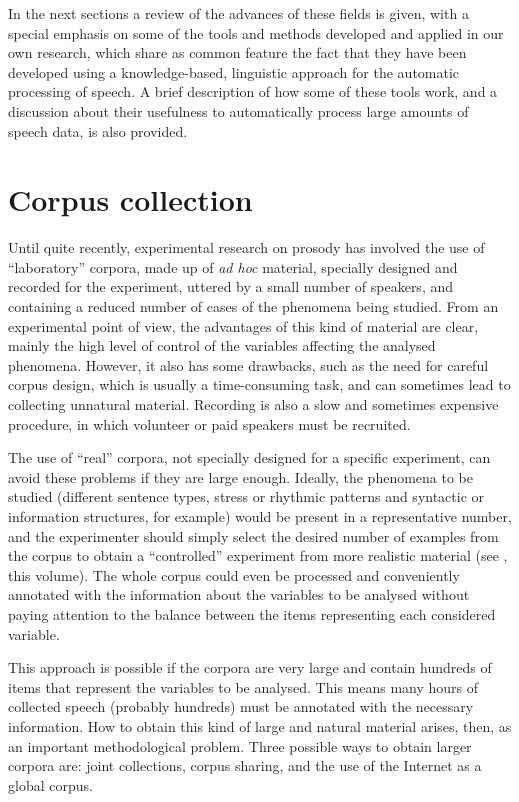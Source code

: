 \documentclass[output=paper]{langsci/langscibook}
\begin{document}
In the next sections a review of the advances of these fields is given, with a special emphasis on some of the tools and methods developed and applied in our own research, which share as common feature the fact that they have been developed using a knowledge-based, linguistic approach for the automatic processing of speech. A brief description of how some of these tools work, and a discussion about their usefulness to automatically process large amounts of speech data, is also provided.

\section{Corpus collection}

Until quite recently, experimental research on prosody has involved the use of ``laboratory'' corpora, made up of \textit{ad hoc} material, specially designed and recorded for the experiment, uttered by a small number of speakers, and containing a reduced number of cases of the phenomena being studied. From an experimental point of view, the advantages of this kind of material are clear, mainly the high level of control of the variables affecting the analysed phenomena. However, it also has some drawbacks, such as the need for careful corpus design, which is usually a time-consuming task, and can sometimes lead to collecting unnatural material. Recording is also a slow and sometimes expensive procedure, in which volunteer or paid speakers must be recruited.

The use of ``real'' corpora, not specially designed for a specific experiment, can avoid these problems if they are large enough. Ideally, the phenomena to be studied (different sentence types, stress or rhythmic patterns and syntactic or information structures, for example) would be present in a representative number, and the experimenter should simply select the desired number of examples from the corpus to obtain a ``controlled'' experiment from more realistic material (see \citeauthor{Peskova.2018}, this volume). The whole corpus could even be processed and conveniently annotated with the information about the variables to be analysed without paying attention to the balance between the items representing each considered variable.

This approach is possible if the corpora are very large and contain hundreds of items that represent the variables to be analysed. This means many hours of collected speech (probably hundreds) must be annotated with the necessary information. How to obtain this kind of large and natural material arises, then, as an important methodological problem. Three possible ways to obtain larger corpora are: joint collections, corpus sharing, and the use of the Internet as a global corpus.
\end{document}

